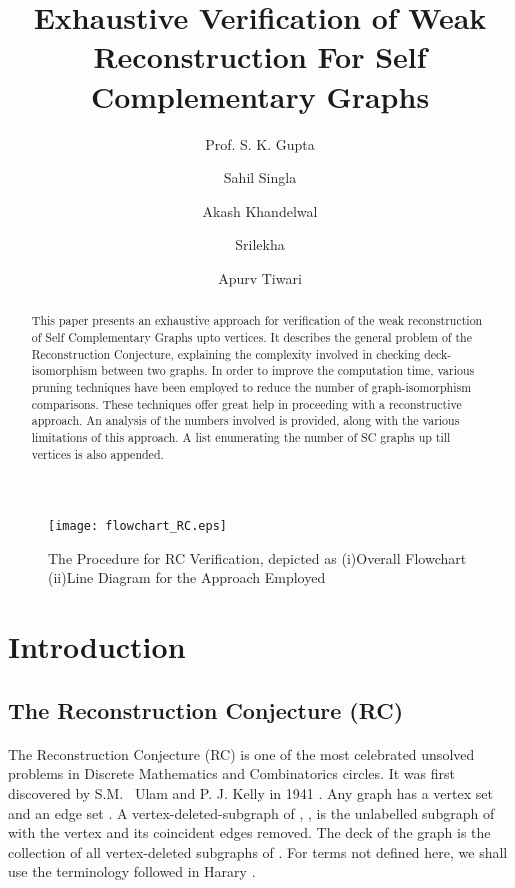 \documentclass[12pt,conference]{IEEEtran}
\begin{document}
\title{Exhaustive Verification of Weak Reconstruction For Self Complementary Graphs }
\author{{ Prof. S. K. Gupta} \and { Sahil Singla} \and { Akash Khandelwal}\and { Srilekha} \and { Apurv Tiwari }}
\author{   }

\maketitle

\begin{abstract}
This paper presents an exhaustive approach for verification of the weak reconstruction of Self Complementary Graphs upto  vertices. It describes the general problem of the Reconstruction Conjecture, explaining the complexity involved in checking deck-isomorphism between two graphs. In order to improve the computation time, various pruning  techniques have been employed to reduce the number of graph-isomorphism comparisons. These techniques offer great help in proceeding with a reconstructive approach. An analysis of the numbers involved is provided, along with the various limitations of this approach. A list enumerating the number of SC graphs up till  vertices is also appended.  
\end{abstract}


\begin{figure*}
	  \centering 
           \texttt{[image: flowchart\_RC.eps]}
	   \caption{The Procedure for RC Verification, depicted as (i)Overall Flowchart (ii)Line Diagram for the Approach Employed}
	   \label{flowchart}
  \end{figure*} 


\section{Introduction}
\subsection{ The Reconstruction Conjecture (RC)}
\paragraph*{} The Reconstruction Conjecture (RC) is one of the most celebrated unsolved problems in Discrete Mathematics and Combinatorics circles. It was first discovered by S.M.  Ulam and P. J. Kelly in 1941 \cite{b3} . Any graph  has a vertex set  and an edge set . A vertex-deleted-subgraph of , , is the unlabelled subgraph of  with the  vertex and its coincident edges removed. The deck of the graph  is the collection of all vertex-deleted subgraphs of . For terms not defined here, we shall use the terminology followed in Harary \cite{h1}. 
\end{document}
